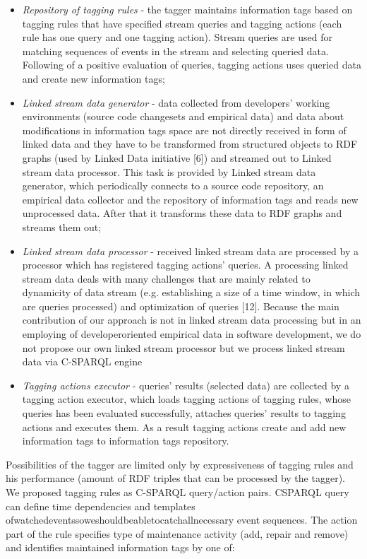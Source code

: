 \documentclass[18px,a4, conference]{IEEEtran}
\begin{document}
\begin{itemize}
\item{\textit{Repository of tagging rules} - the tagger maintains information tags based on tagging rules that have speciﬁed stream queries and tagging actions (each rule has one query and one tagging action). Stream queries are used for matching sequences of events in the stream and selecting queried data. Following of a positive evaluation of queries, tagging actions uses queried data and create new information tags;}
\item{\textit{Linked stream data generator} - data collected from developers’ working environments (source code changesets and empirical data) and data about modiﬁcations in information tags space are not directly received in form of linked data and they have to be transformed from structured objects to RDF graphs (used by Linked Data initiative [6]) and streamed out to Linked stream data processor. This task is provided by Linked stream data generator, which periodically connects to a source code repository, an empirical data collector and the repository of information tags and reads new unprocessed data. After that it transforms these data to RDF graphs and streams them out;}
\item{\textit{Linked stream data processor} - received linked stream data are processed by a processor which has registered tagging actions’ queries. A processing linked stream data deals with many challenges that are mainly related to dynamicity of data stream (e.g. establishing a size of a time window, in which are queries processed) and optimization of queries [12]. Because the main contribution of our approach is not in linked stream data processing but in an employing of developeroriented empirical data in software development, we do not propose our own linked stream processor but we process linked stream data via C-SPARQL engine \cite{Barbieri:2010:EEC:1739041.1739095,}}
\item{\textit{Tagging actions executor} - queries’ results (selected data) are collected by a tagging action executor, which loads tagging actions of tagging rules, whose queries has been evaluated successfully, attaches queries’ results to tagging actions and executes them. As a result tagging actions create and add new information tags to information tags repository.}
\end{itemize}

 Possibilities of the tagger are limited only by expressiveness of tagging rules and his performance (amount of RDF triples that can be processed by the tagger). We proposed tagging rules as C-SPARQL query/action pairs. CSPARQL query can deﬁne time dependencies and templates ofwatchedeventssoweshouldbeabletocatchallnecessary event sequences. The action part of the rule speciﬁes type of maintenance activity (add, repair and remove) and identiﬁes maintained information tags by one of:
\end{document}
